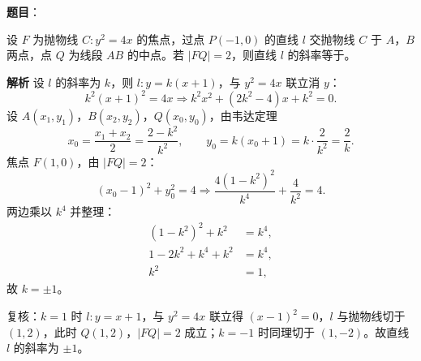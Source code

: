\begin{answer}

\textbf{题目}：

设 $F$ 为抛物线 $C:y^2=4x$ 的焦点，过点 $P(-1,0)$ 的直线 $l$ 交抛物线 $C$ 于 $A$，$B$ 两点，点 $Q$ 为线段 $AB$ 的中点。若 $|FQ|=2$，则直线 $l$ 的斜率等于\gkblank{}。

\textbf{解析}
设 $l$ 的斜率为 $k$，则 $l:y=k(x+1)$，与 $y^2=4x$ 联立消 $y$：
\nopagebreak[4]
\[k^2(x+1)^2=4x\Longrightarrow k^2x^2+(2k^2-4)x+k^2=0.\]
设 $A(x_1,y_1)$，$B(x_2,y_2)$，$Q(x_0,y_0)$，由韦达定理
\nopagebreak[4]
\[x_0=\frac{x_1+x_2}2=\frac{2-k^2}{k^2},\qquad y_0=k(x_0+1)=k\cdot\frac2{k^2}=\frac2k.\]
焦点 $F(1,0)$，由 $|FQ|=2$：
\nopagebreak[4]
\[(x_0-1)^2+y_0^2=4\Longrightarrow \frac{4(1-k^2)^2}{k^4}+\frac4{k^2}=4.\]
两边乘以 $k^4$ 并整理：
\nopagebreak[4]
\[\begin{aligned}
(1-k^2)^2+k^2&=k^4,\\
1-2k^2+k^4+k^2&=k^4,\\
k^2&=1,
\end{aligned}\]
故 $k=\pm1$。

复核：$k=1$ 时 $l:y=x+1$，与 $y^2=4x$ 联立得 $(x-1)^2=0$，$l$ 与抛物线切于 $(1,2)$，此时 $Q(1,2)$，$|FQ|=2$ 成立；$k=-1$ 时同理切于 $(1,-2)$。故直线 $l$ 的斜率为 $\pm1$。


\end{answer}
